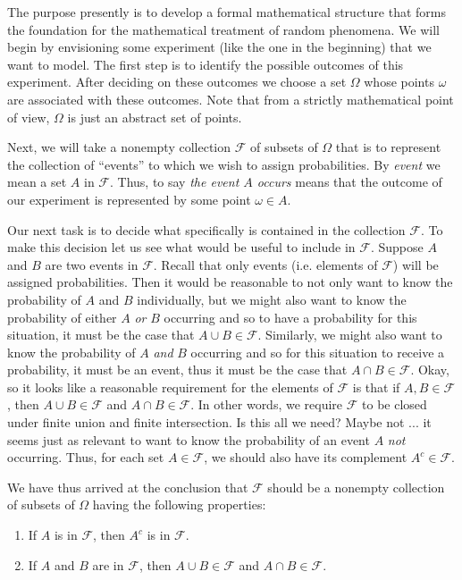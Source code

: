 \documentclass{article}
\theoremstyle{definition}
\theoremstyle{remark}
\theoremstyle{definition}
\begin{document}
The purpose presently is to develop a formal mathematical structure that forms the foundation for the mathematical treatment of random phenomena. We will begin by envisioning some experiment (like the one in the beginning) that we want to model. The first step is to identify the possible outcomes of this experiment. After deciding on these outcomes we choose a set $\Omega$ whose points $\omega$ are associated with these outcomes. Note that from a strictly mathematical point of view, $\Omega$ is just an abstract set of points.\par Next, we will take a nonempty collection $\mathcal{F}$ of subsets of $\Omega$ that is to represent the collection of ``events'' to which we wish to assign probabilities. By \textit{event} we mean a set $A$ in $\mathcal{F}$. Thus, to say \textit{the event $A$ occurs} means that the outcome of our experiment is represented by some point $\omega\in A$.\par Our next task is to decide what specifically is contained in the collection $\mathcal{F}$. To make this decision let us see what would be useful to include in $\mathcal{F}$. Suppose $A$ and $B$ are two events in $\mathcal{F}$. Recall that only events (i.e. elements of $\mathcal{F}$) will be assigned probabilities. Then it would be reasonable to not only want to know the probability of $A$ and $B$ individually, but we might also want to know the probability of either $A$ \textit{or} $B$ occurring and so to have a probability for this situation, it must be the case that $A\cup B\in\mathcal{F}$. Similarly, we might also want to know the probability of $A$ \textit{and} $B$ occurring and so for this situation to receive a probability, it must be an event, thus it must be the case that $A\cap B\in\mathcal{F}$. Okay, so it looks like a reasonable requirement for the elements of $\mathcal{F}$ is that if $A,B\in\mathcal{F}$, then $A\cup B\in\mathcal{F}$ and $A\cap B\in\mathcal{F}$. In other words, we require $\mathcal{F}$ to be closed under finite union and finite intersection. Is this all we need? Maybe not ... it seems just as relevant to want to know the probability of an event $A$ \textit{not} occurring. Thus, for each set $A\in\mathcal{F}$, we should also have its complement $A^{c}\in\mathcal{F}$.\par We have thus arrived at the conclusion that $\mathcal{F}$ should be a nonempty collection of subsets of $\Omega$ having the following properties: 

\begin{enumerate}[label=(\roman*)]
    \item If $A$ is in $\mathcal{F}$, then $A^{c}$ is in $\mathcal{F}$. 
    \item If $A$ and $B$ are in $\mathcal{F}$, then $A\cup B\in\mathcal{F}$ and $A\cap B\in\mathcal{F}$.
\end{enumerate}
\end{document}
